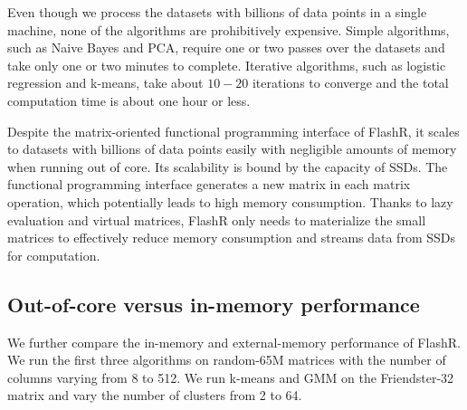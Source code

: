 Even though we process the datasets with billions of data points in a single
machine, none of the algorithms are prohibitively expensive. Simple algorithms,
such as Naive Bayes and PCA, require one or two passes over the datasets and
take only one or two minutes to complete. Iterative
algorithms, such as logistic regression and k-means, take about $10-20$
iterations to converge and the total computation time is about one hour or
less.

Despite the matrix-oriented functional programming interface of FlashR,
it scales to datasets with billions of data points easily with negligible
amounts of memory when running out of core.
Its scalability is bound by the capacity of SSDs. The functional programming
interface generates a new matrix in each matrix operation, which potentially
leads to high memory consumption. Thanks to lazy evaluation and virtual matrices,
FlashR only needs to materialize the small matrices to effectively reduce
memory consumption and streams data from SSDs for computation.

\subsection{Out-of-core versus in-memory performance}
We further compare the in-memory and external-memory performance of FlashR.
We run the first three algorithms on random-65M matrices
with the number of columns varying from 8 to 512. We run k-means
and GMM on the Friendster-32 matrix and vary the number of clusters from 2 to 64.

